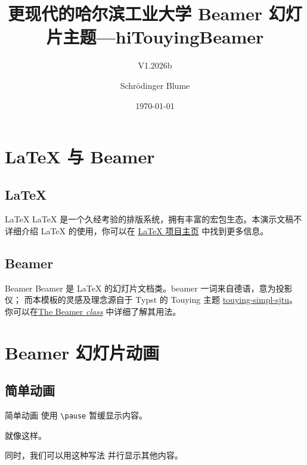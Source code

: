 \documentclass[aspectratio=169]{ctexbeamer} %
\title{更现代的哈尔滨工业大学 Beamer 幻灯片主题—hiTouyingBeamer}
\subtitle{V1.2026b}
\author{Schrödinger Blume}
\date{\today}
\institute{哈尔滨工业大学}
\begin{document}
\TitleSlide

\BlueTitleSlide

\OutlineSlide

\section{LaTeX 与 Beamer}

\subsection{LaTeX}

\begin{frame}{LaTeX}
  LaTeX 是一个久经考验的排版系统，拥有丰富的宏包生态。本演示文稿不详细介绍
  LaTeX 的使用，你可以在 \href{https://www.latex-project.org/}{LaTeX 项目主页}
  中找到更多信息。
\end{frame}

\subsection{Beamer}

\begin{frame}{Beamer}
  Beamer 是 LaTeX 的幻灯片文档类。beamer 一词来自德语，意为投影仪；
  而本模板的灵感及理念源自于 Typst 的 Touying 主题
  \href{https://github.com/sjtug/touying-sjtu}{touying-simpl-sjtu}。
  你可以在\href{https://latex.us/macros/latex/contrib/beamer/doc/beameruserguide.pdf}{The Beamer \textit{class}}
  中详细了解其用法。
\end{frame}

\section{Beamer 幻灯片动画}

\subsection{简单动画}

\begin{frame}{简单动画}
  使用 \texttt{\textbackslash pause} \pause 暂缓显示内容。

  \pause
  就像这样。

  \setcounter{beamerpauses}{1}
  同时，\pause 我们可以用这种写法 \pause 并行显示其他内容。

\end{frame}
\end{document}
